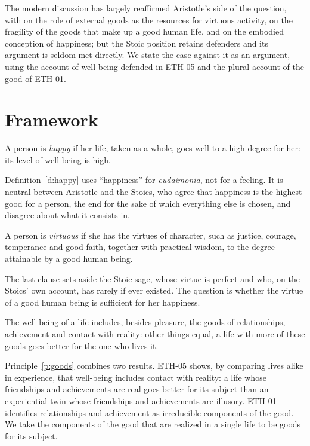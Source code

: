 \documentclass{situationist-preprint}
\begin{document}
The modern discussion has largely reaffirmed Aristotle's side of the question, with \citet{Cooper1985} on the role of external goods as the resources for virtuous activity, \citet{Nussbaum1986} on the fragility of the goods that make up a good human life, and \citet{Russell2012} on the embodied conception of happiness; but the Stoic position retains defenders and its argument is seldom met directly. We state the case against it as an argument, using the account of well-being defended in ETH-05 and the plural account of the good of ETH-01.

\section{Framework}

\begin{definition}[Happiness]\label{d:happy}
A person is \emph{happy} if her life, taken as a whole, goes well to a high degree for her: its level of well-being is high.
\end{definition}

Definition~\ref{d:happy} uses \enquote{happiness} for \emph{eudaimonia}, not for a feeling. It is neutral between Aristotle and the Stoics, who agree that happiness is the highest good for a person, the end for the sake of which everything else is chosen, and disagree about what it consists in.

\begin{definition}[Virtue]\label{d:virtue}
A person is \emph{virtuous} if she has the virtues of character, such as justice, courage, temperance and good faith, together with practical wisdom, to the degree attainable by a good human being.
\end{definition}

The last clause sets aside the Stoic sage, whose virtue is perfect and who, on the Stoics' own account, has rarely if ever existed. The question is whether the virtue of a good human being is sufficient for her happiness.

\begin{principle}\label{p:goods}
The well-being of a life includes, besides pleasure, the goods of relationships, achievement and contact with reality: other things equal, a life with more of these goods goes better for the one who lives it.
\end{principle}

Principle~\ref{p:goods} combines two results. ETH-05 shows, by comparing lives alike in experience, that well-being includes contact with reality: a life whose friendships and achievements are real goes better for its subject than an experiential twin whose friendships and achievements are illusory. ETH-01 identifies relationships and achievement as irreducible components of the good. We take the components of the good that are realized in a single life to be goods for its subject.
\end{document}
